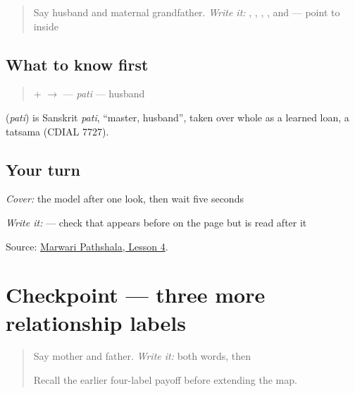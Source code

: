 \label{lesson:MW-C09-pati}



\begin{quote}
Say husband and maternal grandfather. \emph{Write it:} \textbf{}, \textbf{}, \textbf{}, \textbf{}, and \textbf{} — point to \textbf{} inside \textbf{}
\end{quote}

\subsection*{What to know first}
\begin{quote}
\textbf{} + \textbf{} $\to$ \textbf{} — \emph{pati} — husband
\end{quote}

\begin{cousinweb}
\textbf{} (\emph{pati}) is Sanskrit \emph{pati}, \textquotedblleft{}master, husband\textquotedblright{}, taken over whole as a learned loan, a tatsama (CDIAL 7727).
\end{cousinweb}

\subsection*{Your turn}
\emph{Cover:} the model after one look, then wait five seconds

\emph{Write it:} \textbf{} — check that \textbf{} appears before \textbf{} on the page but is read after it

\begin{tcolorbox}[breakable,colback=teal!4,colframe=teal!35!black,title={Before you move on}]
Source: \href{https://www.marwaripathshala.com/marwari-lesson-4-english}{Marwari Pathshala, Lesson 4}.
\end{tcolorbox}
\section[Practice]{Checkpoint — three more relationship labels}

\label{lesson:MW-R09-maternal-three}



\begin{quote}
Say mother and father. \emph{Write it:} both words, then \textbf{}

Recall the earlier four-label payoff before extending the map.
\end{quote}

